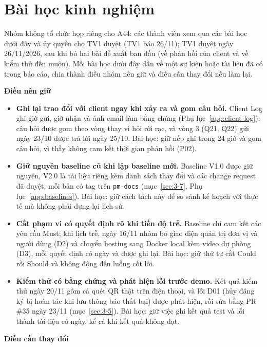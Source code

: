 \section{Bài học kinh nghiệm}
\label{sec:4-5}

Nhóm không tổ chức họp riêng cho A44: các thành viên xem qua các bài học dưới đây và ủy quyền cho TV1 duyệt (TV1 báo 26/11); TV1 duyệt ngày 26/11/2026, sau khi bỏ hai bài đề xuất ban đầu (về phản hồi của client và về kiểm thử đến muộn). Mỗi bài học dưới đây dẫn về một sự kiện hoặc tài liệu đã có trong báo cáo, chia thành điều nhóm nên giữ và điều cần thay đổi nếu làm lại.

\textbf{Điều nên giữ}

\begin{itemize}
  \item \textbf{Ghi lại trao đổi với client ngay khi xảy ra và gom câu hỏi.} Client Log ghi giờ gửi, giờ nhận và ảnh email làm bằng chứng (Phụ lục~\ref{app:client-log}); câu hỏi được gom theo vòng thay vì hỏi rời rạc, và vòng 3 (Q21, Q22) gửi ngày 23/10 được trả lời ngày 25/10. Bài học: giữ nếp ghi trong 24 giờ và gom câu hỏi, vì thầy không cam kết thời gian phản hồi (P02).
  \item \textbf{Giữ nguyên baseline cũ khi lập baseline mới.} Baseline V1.0 được giữ nguyên, V2.0 là tài liệu riêng kèm danh sách thay đổi và các change request đã duyệt, mỗi bản có tag trên \texttt{pm-docs} (mục~\ref{sec:3-7}, Phụ lục~\ref{app:baselines}). Bài học: giữ cách tách này để so sánh kế hoạch với thực tế mà không phải dựng lại lịch sử.
  \item \textbf{Cắt phạm vi có quyết định rõ khi tiến độ trễ.} Baseline chỉ cam kết các yêu cầu Must; khi lịch trễ, ngày 16/11 nhóm bỏ giao diện quản trị đơn vị và người dùng (D2) và chuyển hosting sang Docker local kèm video dự phòng (D3), mỗi quyết định có ngày và được ghi lại. Bài học: giữ thứ tự cắt Could rồi Should và không động đến luồng cốt lõi.
  \item \textbf{Kiểm thử có bằng chứng và phát hiện lỗi trước demo.} Kết quả kiểm thử ngày 20/11 gồm cả quét QR thật trên điện thoại, và lỗi D01 (hủy đăng ký bị hoàn tác khi lưu thông báo thất bại) được phát hiện, rồi sửa bằng PR \#35 ngày 23/11 (mục~\ref{sec:3-5}). Bài học: giữ việc ghi kết quả test và lỗi thành tài liệu có ngày, kể cả khi kết quả không đạt.
\end{itemize}

\textbf{Điều cần thay đổi}

